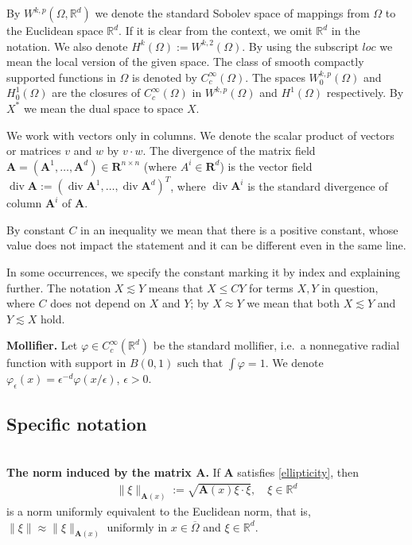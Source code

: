 \documentclass[12pt,a4paper]{amsart}
\theoremstyle{definition}
\newcommand{\R}{\mathbb{R}}
\newcommand{\A}{\mathbf{A}}
\newcommand*\Div{\operatorname{div}}
\begin{document}
 By $W^{k,p}(\Omega,\mathbb{R}^d)$ we denote the standard Sobolev space of mappings from $\Omega$ to the Euclidean space $\mathbb{R}^d$. If it is clear from the context, we omit $\R^d$ in the notation. We also denote $H^k(\Omega) := W^{k,2}(\Omega)$.
By using the subscript $loc$ we mean the local version of the given space. The class of smooth compactly supported functions in $\Omega$ is denoted by $C_c^\infty(\Omega)$. The spaces $W^{k,p}_{0}(\Omega)$ and $H_0^1(\Omega)$ are the closures of  $C_c^\infty(\Omega)$ in $W^{k,p}(\Omega)$ and $H^1(\Omega)$ respectively. By $X^*$ we mean the dual space to space $X$.\medskip

 We work with vectors only in columns. We denote the scalar product of vectors or matrices $v$ and $w$ by $v\cdot w$. The divergence of the matrix field $\A=(\A^1,\dots , \A^d)\in \mathbf{R}^{n\times n}$ (where $A^i\in \mathbf{R}^d$) is the vector field $\operatorname{div}\A:= (\Div\A^1,\dots , \Div\A^d)^T$, where $\operatorname{div} \mathbf{A}^i$ is the standard divergence of column $\A^i$ of $\A$.
    


By constant $C$ in an inequality we mean that there is a positive constant, whose value does not impact the statement and it can be different even in the same line. 

In some occurrences, we specify the constant marking it by index and explaining further. The notation $X\lesssim Y$ means that $X\leq C Y$ for terms $X,Y$ in question, where $C$ does not depend on $X$ and $Y$; by $X\approx Y$ we mean that both $X\lesssim Y$ and $Y\lesssim X$ hold. \medskip

\noindent \textbf{Mollifier.} Let $\varphi\in C_c^\infty(\R^d)$ be the standard mollifier, i.e.~a nonnegative radial function with support in $B(0,1)$ such that $\int \varphi = 1$. We denote $\varphi_\epsilon(x) = \epsilon^{-d}\varphi(x/\epsilon)$, $\epsilon > 0$.
\subsection{Specific notation} \ \medskip \\ 
\textbf{The norm induced by the matrix $\A$.} If $\A$ satisfies \eqref{ellipticity}, then 
\begin{align*}
    \|\xi\|_{\A(x)} := \sqrt{ \A(x)\xi\cdot \xi},\quad \xi\in \R^d
\end{align*}
is a norm uniformly equivalent to the Euclidean norm, that is, $\|\xi\|\approx\| \xi\|_{\A(x)}$ uniformly in $x\in \overline{\Omega}$ and $\xi\in \R^d$. \smallskip
\end{document}
